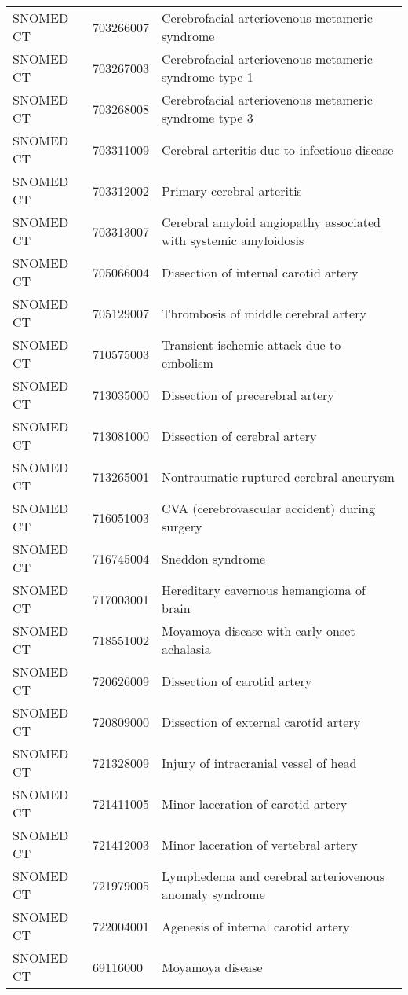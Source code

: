 \begin{longtable}{p{}p{}p{}}
  SNOMED CT & 703266007 & Cerebrofacial arteriovenous metameric syndrome \\ 
  SNOMED CT & 703267003 & Cerebrofacial arteriovenous metameric syndrome type 1 \\ 
  SNOMED CT & 703268008 & Cerebrofacial arteriovenous metameric syndrome type 3 \\ 
  SNOMED CT & 703311009 & Cerebral arteritis due to infectious disease \\ 
  SNOMED CT & 703312002 & Primary cerebral arteritis \\ 
  SNOMED CT & 703313007 & Cerebral amyloid angiopathy associated with systemic amyloidosis \\ 
  SNOMED CT & 705066004 & Dissection of internal carotid artery \\ 
  SNOMED CT & 705129007 & Thrombosis of middle cerebral artery \\ 
  SNOMED CT & 710575003 & Transient ischemic attack due to embolism \\ 
  SNOMED CT & 713035000 & Dissection of precerebral artery \\ 
  SNOMED CT & 713081000 & Dissection of cerebral artery \\ 
  SNOMED CT & 713265001 & Nontraumatic ruptured cerebral aneurysm \\ 
  SNOMED CT & 716051003 & CVA (cerebrovascular accident) during surgery \\ 
  SNOMED CT & 716745004 & Sneddon syndrome \\ 
  SNOMED CT & 717003001 & Hereditary cavernous hemangioma of brain \\ 
  SNOMED CT & 718551002 & Moyamoya disease with early onset achalasia \\ 
  SNOMED CT & 720626009 & Dissection of carotid artery \\ 
  SNOMED CT & 720809000 & Dissection of external carotid artery \\ 
  SNOMED CT & 721328009 & Injury of intracranial vessel of head \\ 
  SNOMED CT & 721411005 & Minor laceration of carotid artery \\ 
  SNOMED CT & 721412003 & Minor laceration of vertebral artery \\ 
  SNOMED CT & 721979005 & Lymphedema and cerebral arteriovenous anomaly syndrome \\ 
  SNOMED CT & 722004001 & Agenesis of internal carotid artery \\ 
  SNOMED CT & 69116000 & Moyamoya disease \\ 

\end{longtable}
